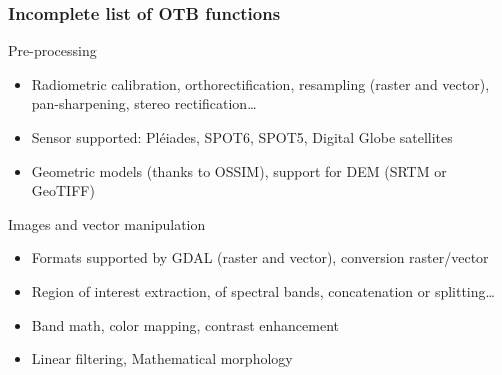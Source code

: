 \documentclass[8pt]{beamer}
\begin{document}
\begin{frame}
\frametitle{Incomplete list of OTB functions}

\begin{block}{Pre-processing}
\begin{itemize}
\item Radiometric calibration, orthorectification, resampling (raster and
  vector), pan-sharpening, stereo rectification\ldots
\item Sensor supported: Pléiades, SPOT6, SPOT5, Digital Globe satellites
\item Geometric models (thanks to OSSIM), support for DEM (SRTM or GeoTIFF)
\end{itemize}
\end{block}

\begin{block}{Images and vector manipulation}
\begin{itemize}
\item Formats supported by GDAL (raster and vector), conversion raster/vector
\item Region of interest extraction, of spectral bands, concatenation or splitting\ldots
\item Band math, color mapping, contrast enhancement
\item Linear filtering, Mathematical morphology
\end{itemize}
\end{block}
\end{frame}
\end{document}
